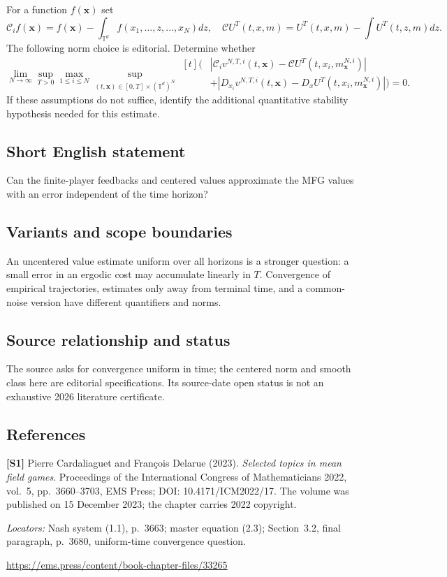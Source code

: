 \documentclass[11pt,a4paper]{article}
\begin{document}
For a function $f(\boldsymbol x)$ set
\[
 \mathcal C_i f(\boldsymbol x)=f(\boldsymbol x)-\int_{\mathbb T^d}f(x_1,\ldots,z,\ldots,x_N)dz,
 \quad \mathcal C U^T(t,x,m)=U^T(t,x,m)-\int U^T(t,z,m)dz.
\]
The following norm choice is editorial. Determine whether
\[
 \lim_{N\to\infty}\sup_{T>0}\max_{1\leq i\leq N}
 \sup_{(t,\boldsymbol x)\in[0,T]\times(\mathbb T^d)^N}
 \begin{aligned}[t]
 \big(&|\mathcal C_i v^{N,T,i}(t,\boldsymbol x)
       -\mathcal C U^T(t,x_i,m^{N,i}_{\boldsymbol x})|\\[-2pt]
 &+|D_{x_i}v^{N,T,i}(t,\boldsymbol x)
       -D_xU^T(t,x_i,m^{N,i}_{\boldsymbol x})|\big)=0.
 \end{aligned}
\]
If these assumptions do not suffice, identify the additional quantitative stability hypothesis needed for this estimate.
\subsection*{Short English statement}
Can the finite-player feedbacks and centered values approximate the MFG values with an error independent of the time horizon?
\subsection*{Variants and scope boundaries}
An uncentered value estimate uniform over all horizons is a stronger question: a small error in an ergodic cost may accumulate linearly in $T$. Convergence of empirical trajectories, estimates only away from terminal time, and a common-noise version have different quantifiers and norms.
\subsection*{Source relationship and status}
The source asks for convergence uniform in time; the centered norm and smooth class here are editorial specifications. Its source-date open status is not an exhaustive 2026 literature certificate.
\subsection*{References}
\begingroup\footnotesize\raggedright
{\footnotesize\raggedright
\textbf{[S1]} Pierre Cardaliaguet and Fran\c{c}ois Delarue (2023). \emph{Selected topics in mean field games}. Proceedings of the International Congress of Mathematicians 2022, vol.~5, pp.~3660--3703, EMS Press; DOI: 10.4171/ICM2022/17. The volume was published on 15 December 2023; the chapter carries 2022 copyright.\par
\textit{Locators:} Nash system (1.1), p.~3663; master equation (2.3); Section~3.2, final paragraph, p.~3680, uniform-time convergence question.\par
\url{https://ems.press/content/book-chapter-files/33265}\par}
\par\endgroup
\end{document}
